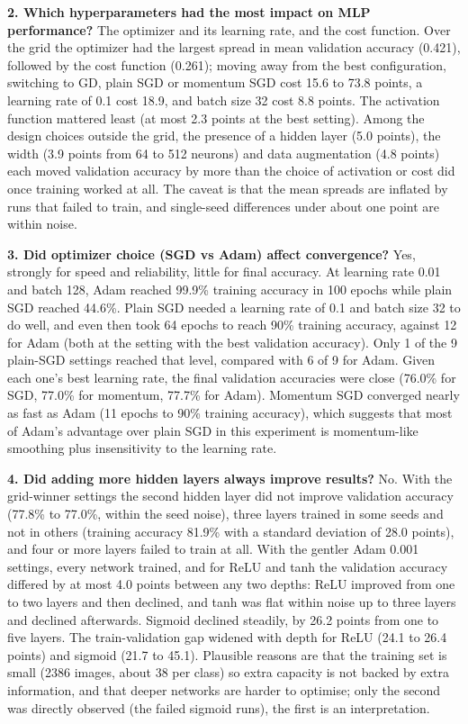 \documentclass[12pt,a4paper]{article}
\begin{document}
\textbf{2. Which hyperparameters had the most impact on MLP performance?} The optimizer and its
learning rate, and the cost function. Over the grid the optimizer had the largest spread in mean
validation accuracy (0.421), followed by the cost function
(0.261); moving away from the best configuration, switching to GD,
plain SGD or momentum SGD cost 15.6 to
73.8 points, a learning rate of 0.1 cost
18.9, and batch size 32 cost 8.8 points. The
activation function mattered least (at most 2.3 points at the
best setting). Among the design choices outside the grid, the presence of a hidden layer
(5.0 points), the width (3.9 points
from 64 to 512 neurons) and data augmentation
(4.8 points) each moved
validation accuracy by more than the choice of activation or cost did once training worked at all.
The caveat is that the mean spreads are inflated by runs that failed to train, and single-seed
differences under about one point are within noise.

\textbf{3. Did optimizer choice (SGD vs Adam) affect convergence?} Yes, strongly for speed and
reliability, little for final accuracy. At learning rate 0.01 and batch 128, Adam reached
99.9\% training accuracy in 100 epochs while plain SGD reached
44.6\%. Plain SGD needed a learning rate of 0.1 and batch size 32 to do
well, and even then took 64 epochs to reach 90\% training
accuracy, against 12 for Adam (both at the setting with the best
validation accuracy).
Only 1 of the 9 plain-SGD settings reached that level, compared with
6 of 9 for Adam. Given each one's best learning rate, the final
validation accuracies were close (76.0\% for SGD,
77.0\% for momentum, 77.7\% for Adam).
Momentum SGD converged nearly as fast as Adam (11
epochs to 90\% training accuracy), which suggests that most of Adam's advantage over plain SGD in
this experiment is momentum-like smoothing plus insensitivity to the learning rate.

\textbf{4. Did adding more hidden layers always improve results?} No. With the grid-winner
settings the second hidden layer did not improve validation accuracy
(77.8\% to 77.0\%, within the seed noise), three layers trained in
some seeds and not in others (training accuracy 81.9\% with a standard deviation of
28.0 points), and four or more layers failed to train at all. With the gentler Adam 0.001 settings, every network trained, and for ReLU and tanh the validation
accuracy differed by at most 4.0 points between any two depths: ReLU improved from
one to two layers and then declined, and tanh was flat within noise up to three layers and declined
afterwards. Sigmoid declined steadily, by 26.2
points from one to five layers. The train-validation gap widened with depth for ReLU
(24.1 to 26.4 points) and sigmoid
(21.7 to 45.1). Plausible reasons are that the
training set is small (2386 images, about 38 per class) so extra capacity is not backed by extra
information, and that deeper networks are harder to optimise; only the second was directly
observed (the failed sigmoid runs), the first is an interpretation.
\end{document}
